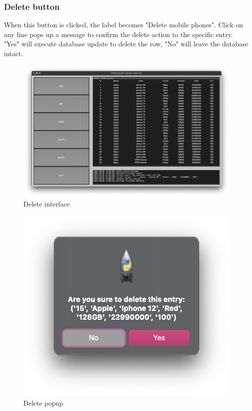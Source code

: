 \documentclass[12pt,oneside,a4paper]{article}
\begin{document}
\subsubsection{Delete button}
When this button is clicked, the label becomes "Delete mobile phones". Click on any line pops up a message to confirm the delete action to the specific entry. "Yes" will execute database update to delete the row, "No" will leave the database intact.
\begin{figure}[H]
  \centerline{\includegraphics[scale=0.35]{delete-clicked.png}}
  \caption{Delete interface}
\end{figure}

\begin{figure}[H]
  \centerline{\includegraphics[scale=0.5]{delete-entry-clicked.png}}
  \caption{Delete popup}
\end{figure}
    
\end{document}
